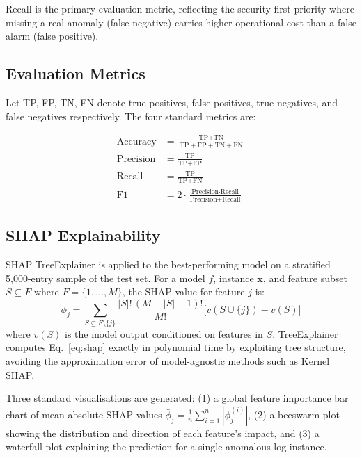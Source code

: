 \documentclass[conference]{IEEEtran}
\begin{document}
Recall is the primary evaluation metric, reflecting the security-first
priority where missing a real anomaly (false negative) carries higher
operational cost than a false alarm (false positive).

\subsection{Evaluation Metrics}

Let TP, FP, TN, FN denote true positives, false positives, true negatives,
and false negatives respectively. The four standard metrics are:

\begin{align}
\text{Accuracy} &= \frac{\text{TP} + \text{TN}}
                        {\text{TP} + \text{FP} + \text{TN} + \text{FN}}
                        \label{eq:acc} \\
\text{Precision} &= \frac{\text{TP}}{\text{TP} + \text{FP}}
                         \label{eq:prec} \\
\text{Recall} &= \frac{\text{TP}}{\text{TP} + \text{FN}}
                      \label{eq:rec} \\
\text{F1} &= 2 \cdot \frac{\text{Precision} \cdot \text{Recall}}
                          {\text{Precision} + \text{Recall}}
                  \label{eq:f1}
\end{align}

\subsection{SHAP Explainability}

SHAP TreeExplainer \cite{lundberg2017} is applied to the best-performing
model on a stratified 5{,}000-entry sample of the test set. For a model
$f$, instance $\mathbf{x}$, and feature subset $S \subseteq F$ where
$F = \{1, \ldots, M\}$, the SHAP value for feature $j$ is:
\begin{equation}
  \phi_j = \sum_{S \subseteq F \setminus \{j\}}
           \frac{|S|!\,(M - |S| - 1)!}{M!}
           \bigl[v(S \cup \{j\}) - v(S)\bigr]
  \label{eq:shap}
\end{equation}
where $v(S)$ is the model output conditioned on features in $S$.
TreeExplainer computes Eq.~\ref{eq:shap} exactly in polynomial time by
exploiting tree structure, avoiding the approximation error of model-agnostic
methods such as Kernel SHAP.

Three standard visualisations are generated: (1) a global feature importance
bar chart of mean absolute SHAP values $\bar{\phi}_j = \frac{1}{n}
\sum_{i=1}^{n} |\phi_j^{(i)}|$, (2) a beeswarm plot showing the distribution
and direction of each feature's impact, and (3) a waterfall plot explaining
the prediction for a single anomalous log instance.
\end{document}

